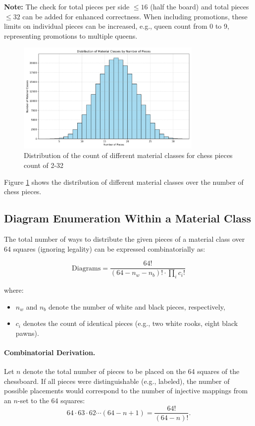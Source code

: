 \documentclass[12pt]{article}
\begin{document}
\noindent
\textbf{Note:} The check for total pieces per side $\leq 16$ (half the board) and total
pieces $\leq 32$ can be added for enhanced correctness. When including promotions, 
these limits on individual pieces can be increased, e.g., queen count
from 0 to 9, representing promotions to multiple queens.

\begin{figure}[h!]
  \centering
  \includegraphics[width=0.8\textwidth]{material_class_histogram.png}
  \caption{Distribution of the count of different material classes for chess pieces count of 2-32}
  \label{fig:material_class_hist}
\end{figure}
Figure \ref{fig:material_class_hist} shows the distribution of different material classes over the number of chess pieces.
\subsection{Diagram Enumeration Within a Material Class}

The total number of ways to distribute the given pieces of a material class over 64 squares (ignoring legality) can be expressed combinatorially as:

\[
\text{Diagrams} = \frac{64!}{(64 - n_w - n_b)! \cdot \prod_i c_i!}
\]

where:
\begin{itemize}
\item $n_w$ and $n_b$ denote the number of white and black pieces, respectively,
\item $c_i$ denotes the count of identical pieces (e.g., two white rooks, eight black pawns).
\end{itemize}

\paragraph{Combinatorial Derivation.}
Let \(n\) denote the total number of pieces to be placed on the 64 squares of the chessboard.  
If all pieces were distinguishable (e.g., labeled), the number of possible placements would correspond to the number of injective mappings from an \(n\)-set to the 64 squares:
\[
64 \cdot 63 \cdot 62 \cdots (64 - n + 1) = \frac{64!}{(64 - n)!}.
\]
\end{document}
